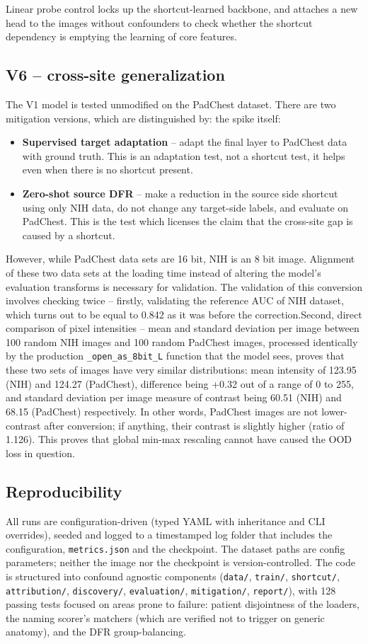 \documentclass{ieeeaccess}
\begin{document}
Linear probe control locks up the shortcut-learned backbone,
and attaches a new head to the images without confounders
to check whether the shortcut dependency is emptying
the learning of core features.

\subsection{V6 -- cross-site generalization}
The V1 model is tested unmodified on the PadChest dataset. There are two mitigation versions, which are distinguished by:
the spike itself:
\begin{itemize}
\item \textbf{Supervised target adaptation} -- adapt the final layer to
PadChest data with ground truth. This is an adaptation test, not a shortcut
test, it helps even when there is no shortcut present.
\item \textbf{Zero-shot source DFR} -- make a reduction in the source side
shortcut using only NIH data, do not change any target-side labels, and
evaluate on PadChest. This is the test which licenses the claim that the
cross-site gap is caused by a shortcut.
\end{itemize}

However, while PadChest data sets are 16 bit, NIH is an 8 bit image.
Alignment of these two data sets at the loading time instead of altering the
model's evaluation transforms is necessary for validation. The validation of
this conversion involves checking twice – firstly, validating the reference
AUC of NIH dataset, which turns out to be equal to 0.842 as it was before
the correction.Second, direct comparison of pixel intensities -- mean and
standard deviation per image  between 100 random NIH images and 100
random PadChest images, processed identically by the production
\texttt{\_open\_as\_8bit\_L} function that the model sees, proves that
these two sets of images have very similar distributions: mean intensity
of 123.95 (NIH) and 124.27 (PadChest), difference being +0.32 out of a
range of 0 to 255, and standard deviation per image  measure of
contrast  being 60.51 (NIH) and 68.15 (PadChest) respectively. In other
words, PadChest images are not lower-contrast after conversion; if
anything, their contrast is slightly higher (ratio of 1.126). This proves
that global min-max rescaling cannot have caused the OOD loss in question.
\subsection{Reproducibility}
All runs are configuration-driven (typed YAML with inheritance and CLI overrides),
seeded and logged to a timestamped log folder that includes the configuration,
\texttt{metrics.json} and the checkpoint. The dataset paths are config parameters;
neither the image nor the checkpoint is version-controlled. The code is structured
into confound agnostic components (\texttt{data/}, \texttt{train/},
\texttt{shortcut/}, \texttt{attribution/}, \texttt{discovery/},
\texttt{evaluation/}, \texttt{mitigation/}, \texttt{report/}), with 128 passing
tests focused on areas prone to failure: patient disjointness of the loaders,
the naming scorer's matchers (which are verified not to trigger on generic anatomy),
and the DFR group-balancing.
\end{document}
